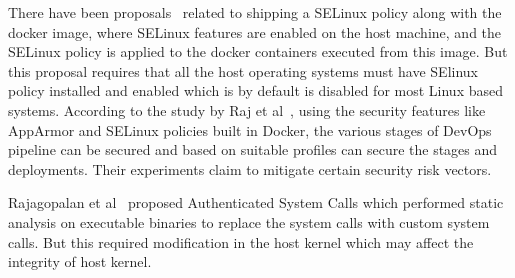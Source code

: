 There have been proposals~\cite{dockerpolicymodules} related to shipping a SELinux policy along with the docker image, where SELinux features are enabled on the host machine, and the SELinux policy is applied to the docker containers executed from this image. But this proposal requires that all the host operating systems must have SElinux policy installed and enabled which is by default is disabled for most Linux based systems. According to the study by Raj et al~\cite{raj2016}, using the security features like AppArmor and SELinux policies built in Docker, the various stages of DevOps pipeline can be secured and based on suitable profiles can secure the stages and deployments. Their experiments claim to mitigate certain security risk vectors.

Rajagopalan et al~\cite{rajgopalan} proposed Authenticated System Calls which performed static analysis on executable binaries to replace the system calls with custom system calls. But this required modification in the host kernel which may affect the integrity of host kernel.
